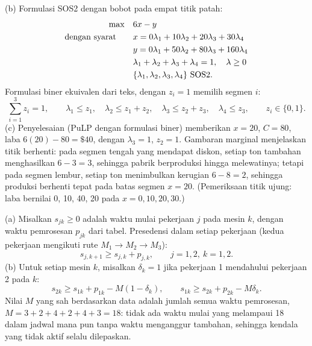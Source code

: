 (b) Formulasi SOS2 dengan bobot pada empat titik patah:
\[
\begin{aligned}
\max\quad & 6x - y\\
\mbox{dengan syarat}\quad\quad & x = 0\lambda_1 + 10\lambda_2 + 20\lambda_3 + 30\lambda_4\\
& y = 0\lambda_1 + 50\lambda_2 + 80\lambda_3 + 160\lambda_4\\
& \lambda_1 + \lambda_2 + \lambda_3 + \lambda_4 = 1,\quad \lambda \geq 0\\
& \{\lambda_1, \lambda_2, \lambda_3, \lambda_4\} \mbox{ SOS2}.
\end{aligned}
\]
Formulasi biner ekuivalen dari teks, dengan $z_i = 1$ memilih segmen $i$:
\[
\sum_{i=1}^{3} z_i = 1,\qquad
\lambda_1 \leq z_1,\quad \lambda_2 \leq z_1 + z_2,\quad \lambda_3 \leq z_2 + z_3,\quad \lambda_4 \leq z_3,\qquad z_i \in \{0,1\}.
\]
(c) Penyelesaian (PuLP dengan formulasi biner) memberikan $x = 20$, $C = 80$, laba $6(20) - 80 = \$40$, dengan $\lambda_3 = 1$, $z_2 = 1$. Gambaran marginal menjelaskan titik berhenti: pada segmen tengah yang mendapat diskon, setiap ton tambahan menghasilkan $6 - 3 = 3$, sehingga pabrik berproduksi hingga melewatinya; tetapi pada segmen lembur, setiap ton menimbulkan kerugian $6 - 8 = 2$, sehingga produksi berhenti tepat pada batas segmen $x = 20$. (Pemeriksaan titik ujung: laba bernilai 0, 10, 40, 20 pada $x = 0, 10, 20, 30$.)


(a) Misalkan $s_{jk} \geq 0$ adalah waktu mulai pekerjaan $j$ pada mesin $k$, dengan waktu pemrosesan $p_{jk}$ dari tabel. Presedensi dalam setiap pekerjaan (kedua pekerjaan mengikuti rute $M_1 \to M_2 \to M_3$):
\[
s_{j,k+1} \geq s_{j,k} + p_{j,k}, \qquad j = 1,2,\ k = 1,2.
\]
(b) Untuk setiap mesin $k$, misalkan $\delta_k = 1$ jika pekerjaan 1 mendahului pekerjaan 2 pada $k$:
\[
s_{2k} \geq s_{1k} + p_{1k} - M(1 - \delta_k),
\qquad
s_{1k} \geq s_{2k} + p_{2k} - M\delta_k.
\]
Nilai $M$ yang sah berdasarkan data adalah jumlah semua waktu pemrosesan, $M = 3+2+4+2+4+3 = 18$: tidak ada waktu mulai yang melampaui 18 dalam jadwal mana pun tanpa waktu menganggur tambahan, sehingga kendala yang tidak aktif selalu dilepaskan.

